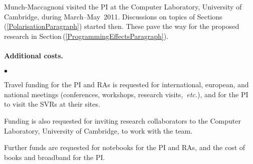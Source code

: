 \documentclass[11pt,twocolumn]{article}
\newenvironment{myitemize}
  {\begin{list}{$\bullet$}
  {\setlength{\topsep}{2pt}
   \setlength{\partopsep}{2pt}
   \setlength{\itemsep}{2.5pt}
   \setlength{\parsep}{2.5pt}
   \setlength{\leftmargin}{1em}
   \setlength{\labelwidth}{.5em}}}
  {\end{list}}
\newcommand{\hidefootnote}[2]{}
\newcommand{\pref}[1]{\,(\ref{#1})}
\newcommand{\Eg}{\emph{Eg.}}
\newcommand{\etc}{\emph{etc.}}
\begin{document}
Munch-Maccagnoni visited the PI at the Computer Laboratory, University of
Cambridge, during March--May~2011.  Discussions on topics of
Sections\pref{PolarisationParagraph} started then.  These pave the way for the
proposed research in Section\pref{ProgrammingEffectsParagraph}.


\paragraph*{Additional costs.}

\begin{myitemize}
\item
Travel funding for the PI and RAs is requested for international, european,
and national meetings (conferences, workshops, research
visits,~\etc),\hidefootnote{\Eg~CALCO, CIE, CSL, CT, ICALP, ICFP, LICS, MFPS,
  POPL, PPDP, PSSL, RTA, TLCA, TYPES, WOLLIC.}{} 
and for the PI to visit the SVRs at their sites. \hidefootnote{\Eg~Aarhus
  (A\,Kock); 
  Bamberg (Mendler);
  Barcelona (J\,Kock);
  Bath (Power); 
  Berkeley (D\,Scott); 
  Birmingham (Escard\'o, Levy); 
  Bologna (Asperti, Dal Lago);
  Buffalo (Lawvere);
  Copenhagen (Birkedal, Filinski); 
  Darmstadt (Streicher); 
  Dublin (Dotsenko);
  Edinburgh (Leinster, Plotkin, A\,Simpson); 
  Genova (Moggi, Rosolini); 
  G\"oteborg (Coquand, Dybjer);
  Gunma (Hamana);
  Ljubljana (Bauer, Pretnar);
  London (Oliva);
  Manchester (Aczel);
  Marseille (Girard, Lafont, Regnier); 
  Montreal (Joyal, Makkai, Panangaden);
  Munich (Abel, Hofmann);
  Nice (C\,Simpson, Vallette);
  Nijmegen (Moerdijk);
  Nottingham (Altenkirch);
  Ottawa (P\,Scott); 
  Oxford (Abramsky, Coecke, Doring); 
  Paris (Burroni, Curien, Herbelin, Krivine, Melli\`es, Metayer);
  Philadelphia (Freyd, Pierce, Weirich);
  Pittsburgh (Avigad, Awodey, Harper, Pfenning, Reynolds);
  Portland (Sheard);
  Princeton (Warren);
  Strathclyde (Ghani, McBride);
  Swansea (Beckmann, Berger);
  Sydney (Garner, Lack, Street);
  Warsaw (Zawadowski).}.
\item
Funding is also requested for inviting research collaborators to the Computer
Laboratory, University of Cambridge, to work with the team.

\item
Further funds are requested for notebooks for the PI and RAs, and the cost of
books and broadband for the PI.
\end{myitemize}
\end{document}
